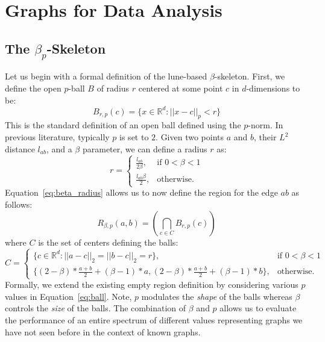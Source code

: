 
\chapter{Graphs for Data Analysis}
\label{ch:graphs}
\vspace{-2em}
\section{The $\beta_p$-Skeleton}
\label{sec:bpskeleton}
Let us begin with a formal definition of the lune-based $\beta$-skeleton.
%
First, we define the open $p$-ball $B$ of radius $r$ centered at some point $c$ in $d$-dimensions to be:
%
\begin{equation}
\label{eq:ball}
    B_{r,p}(c) = \{x \in \mathbb{R}^d : || x  - c ||_p < r\}
\end{equation}
%
This is the standard definition of an open ball defined using the $p$-norm.
%
In previous literature, typically $p$ is set to $2$.
%
Given two points $a$ and $b$, their $L^2$ distance $l_{ab}$, and a $\beta$ parameter, we can define a radius $r$ as:
%
\begin{equation}
    \label{eq:beta_radius}
    r =
    \begin{cases}
        \frac{l_{ab}}{2\beta}, & \text{if $0 < \beta < 1$}\\
        \frac{l_{ab}\beta}{2}, & \text{otherwise}.
    \end{cases}
\end{equation}
%
Equation~\ref{eq:beta_radius} allows us to now define the region for the edge $ab$ as follows:
%
\begin{equation}
    R_{\beta,p}(a,b) = \left(\bigcap_{c \in C} B_{r,p}(c)\right)
\end{equation}
%
where $C$ is the set of centers defining the balls:
%
\begin{equation}
C =
\begin{cases}
    \{c \in \mathbb{R}^d: ||a -c||_2 = ||b - c||_2 = r\}, & \text{if $0 < \beta < 1$}\\
    \{(2-\beta)*\frac{a+b}{2} + (\beta-1)*a, (2-\beta)*\frac{a+b}{2} + (\beta-1)*b\}, & \text{otherwise}.
\end{cases}
\end{equation}
%
Formally, we extend the existing empty region definition by considering various $p$ values in Equation~\ref{eq:ball}.
%
Note, $p$ modulates the \emph{shape} of the balls whereas $\beta$ controls the \emph{size} of the balls.
%
The combination of $\beta$ and $p$ allows us to evaluate the performance of an entire spectrum of different values representing graphs we have not seen before in the context of known graphs.

